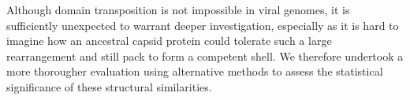 Although domain transposition is not impossible in viral genomes,  it is sufficiently
unexpected to warrant deeper investigation, especially as it is hard to imagine how an ancestral
capsid protein could tolerate such a large rearrangement and still pack to form a competent shell.
We therefore undertook a more thorougher evaluation using alternative methods to assess the statistical 
significance of these structural similarities.

%
% 
% 
